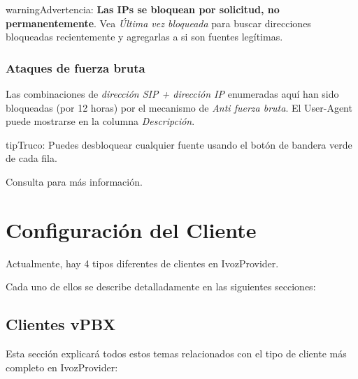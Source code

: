 \documentclass[letterpaper,10pt,spanish]{sphinxmanual}
\begin{document}
\begin{notice}{warning}{Advertencia:}
\textbf{Las IPs se bloquean por solicitud, no permanentemente}. Vea \emph{Última vez bloqueada} para buscar direcciones bloqueadas recientemente y agregarlas a {\hyperref[security_and_maintenance/security/authorized_ip_ranges:authorized\string-ip\string-ranges]{}} si son fuentes legítimas.
\end{notice}


\subsection{Ataques de fuerza bruta}
\label{administration_portal/brand/views/bruteforce_attacks::doc}\label{administration_portal/brand/views/bruteforce_attacks:brute-force-attacks}\label{administration_portal/brand/views/bruteforce_attacks:id1}
Las combinaciones de \emph{dirección SIP + dirección IP} enumeradas aquí han sido bloqueadas (por 12 horas) por el mecanismo de \emph{Anti fuerza bruta}. El User-Agent puede mostrarse en la columna \emph{Descripción}.

\begin{notice}{tip}{Truco:}
Puedes desbloquear cualquier fuente usando el botón de bandera verde de cada fila.
\end{notice}

Consulta {\hyperref[security_and_maintenance/security/antibruteforce:anti\string-brute\string-force\string-attacks]{}} para más información.


\chapter{Configuración del Cliente}
\label{administration_portal/client/index:client-configuration}\label{administration_portal/client/index::doc}
Actualmente, hay 4 tipos diferentes de clientes en IvozProvider.

Cada uno de ellos se describe detalladamente en las siguientes secciones:
\label{administration_portal/client/vpbx/index:vpbx-clients}

\section{Clientes vPBX}
\label{administration_portal/client/vpbx/index:vpbx-clients}\label{administration_portal/client/vpbx/index:clientes-vpbx}\label{administration_portal/client/vpbx/index::doc}\label{administration_portal/client/vpbx/index:id1}
Esta sección explicará todos estos temas relacionados con el tipo de cliente más completo en IvozProvider:
\end{document}
